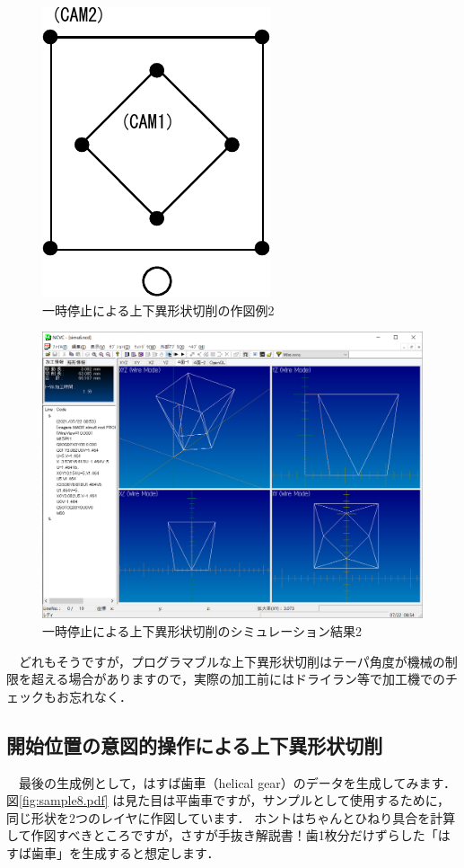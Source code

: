 \begin{figure}[H]
\centering
\includegraphics{No2/fig/sample7-crop.pdf}
\caption{一時停止による上下異形状切削の作図例2}
\label{fig:sample7.pdf}
\end{figure}

\begin{figure}[H]
\centering
\includegraphics[scale=0.5]{No2/fig/simu6.png}
\caption{一時停止による上下異形状切削のシミュレーション結果2}
\label{fig:simu6.png}
\end{figure}

　どれもそうですが，プログラマブルな上下異形状切削はテーパ角度が機械の制限を超える場合がありますので，実際の加工前にはドライラン等で加工機でのチェックもお忘れなく．

\subsection{開始位置の意図的操作による上下異形状切削}
　最後の生成例として，はすば歯車（helical gear）のデータを生成してみます．
図\ref{fig:sample8.pdf} は見た目は平歯車ですが，サンプルとして使用するために，同じ形状を2つのレイヤに作図しています．
ホントはちゃんとひねり具合を計算して作図すべきところですが，さすが手抜き解説書！歯1枚分だけずらした「はすば歯車」を生成すると想定します．

